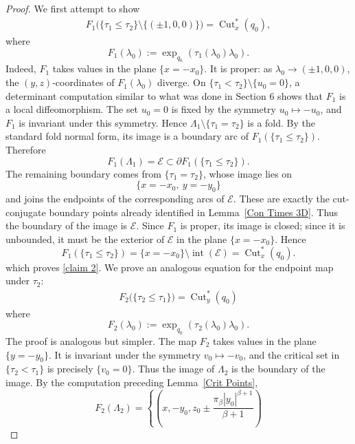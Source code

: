 \documentclass[12pt]{amsart}
\numberwithin{equation}{section}
\theoremstyle{plain}
\theoremstyle{definition}
\theoremstyle{remark}
\begin{document}
\begin{proof}
    We first attempt to show
    \begin{align}\label{claim 2}
        F_1\bigl(\{\tau_1\leq\tau_2\}\setminus\{(\pm1,0,0)\}\bigr)
        =
        \operatorname{Cut}_x^*(q_0),
    \end{align}
    where
    \[
        F_1(\lambda_0):=\exp_{q_0}(\tau_1(\lambda_0)\lambda_0).
    \]
    Indeed, \(F_1\) takes values in the plane \(\{x=-x_0\}\). It is proper: as
    \(\lambda_0\to(\pm1,0,0)\), the \((y,z)\)-coordinates of \(F_1(\lambda_0)\) diverge.
    On \(\{\tau_1<\tau_2\}\setminus\{u_0=0\}\), a determinant computation similar to what was done in Section 6 shows that
    \(F_1\) is a local diffeomorphism. The set \(u_0=0\) is fixed by the symmetry
    \(u_0\mapsto-u_0\), and \(F_1\) is invariant under this symmetry. Hence
    \(\Lambda_1\setminus\{\tau_1=\tau_2\}\) is a fold. By the standard fold normal form,
    its image is a boundary arc of \(F_1(\{\tau_1\leq\tau_2\})\). Therefore
    \[
        F_1(\Lambda_1)=\mathcal E
        \subset
        \partial F_1(\{\tau_1\leq\tau_2\}).
    \]
    The remaining boundary comes from \(\{\tau_1=\tau_2\}\), whose image lies on
    \[
        \{x=-x_0,\ y=-y_0\}
    \]
    and joins the endpoints of the corresponding arcs of \(\mathcal E\). These are exactly
    the cut-conjugate boundary points already identified in Lemma~\ref{Con Times 3D}.
    Thus the boundary of the image is \(\mathcal E\). Since \(F_1\) is proper, its image is
    closed; since it is unbounded, it must be the exterior of \(\mathcal E\) in the plane
    \(\{x=-x_0\}\). Hence
    \[
        F_1(\{\tau_1\leq\tau_2\})
        =
        \{x=-x_0\}\setminus\operatorname{int}(\mathcal E)
        =
        \operatorname{Cut}_x^*(q_0).
    \]
    which proves \eqref{claim 2}. We prove an analogous equation for the endpoint map under $\tau_2$:
    \begin{align}\label{claim 3}F_2\bigl(\{\tau_2\leq\tau_1\}\bigr)
        =
        \operatorname{Cut}_y^*(q_0)\end{align}
    where
    \[
        F_2(\lambda_0):=\exp_{q_0}(\tau_2(\lambda_0)\lambda_0).
    \]
    The proof is analogous but simpler. The map \(F_2\) takes values in the plane
    \(\{y=-y_0\}\). It is invariant under the symmetry \(v_0\mapsto -v_0\), and the critical
    set in \(\{\tau_2<\tau_1\}\) is precisely \(\{v_0=0\}\). Thus the image of
    \(\Lambda_2\) is the boundary of the image. By the computation preceding
    Lemma~\ref{Crit Points},
    \[
        F_2(\Lambda_2)
        =
        \left\{
        (x,-y_0,z_0\pm
        \frac{\pi_\beta |y_0|^{\beta+1}}{\beta+1})
\]
\end{proof}
\end{document}
